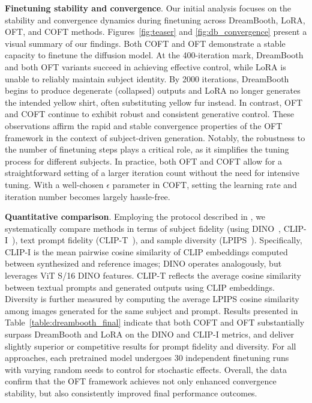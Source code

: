{\textbf{Finetuning stability and convergence}. Our initial analysis focuses on the stability and convergence dynamics during finetuning across DreamBooth, LoRA, OFT, and COFT methods. Figures~\ref{fig:teaser} and \ref{fig:db_convergence} present a visual summary of our findings. Both COFT and OFT demonstrate a stable capacity to finetune the diffusion model. At the 400-iteration mark, DreamBooth and both OFT variants succeed in achieving effective control, while LoRA is unable to reliably maintain subject identity. By 2000 iterations, DreamBooth begins to produce degenerate (collapsed) outputs and LoRA no longer generates the intended yellow shirt, often substituting yellow fur instead. In contrast, OFT and COFT continue to exhibit robust and consistent generative control. These observations affirm the rapid and stable convergence properties of the OFT framework in the context of subject-driven generation. Notably, the robustness to the number of finetuning steps plays a critical role, as it simplifies the tuning process for different subjects. In practice, both OFT and COFT allow for a straightforward setting of a larger iteration count without the need for intensive tuning. With a well-chosen $\epsilon$ parameter in COFT, setting the learning rate and iteration number becomes largely hassle-free.

\textbf{Quantitative comparison}. Employing the protocol described in \cite{ruiz2023dreambooth}, we systematically compare methods in terms of subject fidelity (using DINO~\cite{caron2021emerging}, CLIP-I~\cite{radford2021learning}), text prompt fidelity (CLIP-T~\cite{radford2021learning}), and sample diversity (LPIPS~\cite{zhang2018unreasonable}). Specifically, CLIP-I is the mean pairwise cosine similarity of CLIP embeddings computed between synthesized and reference images; DINO operates analogously, but leverages ViT S/16 DINO features. CLIP-T reflects the average cosine similarity between textual prompts and generated outputs using CLIP embeddings. Diversity is further measured by computing the average LPIPS cosine similarity among images generated for the same subject and prompt. Results presented in Table~\ref{table:dreambooth_final} indicate that both COFT and OFT substantially surpass DreamBooth and LoRA on the DINO and CLIP-I metrics, and deliver slightly superior or competitive results for prompt fidelity and diversity. For all approaches, each pretrained model undergoes 30 independent finetuning runs with varying random seeds to control for stochastic effects. Overall, the data confirm that the OFT framework achieves not only enhanced convergence stability, but also consistently improved final performance outcomes.

}
